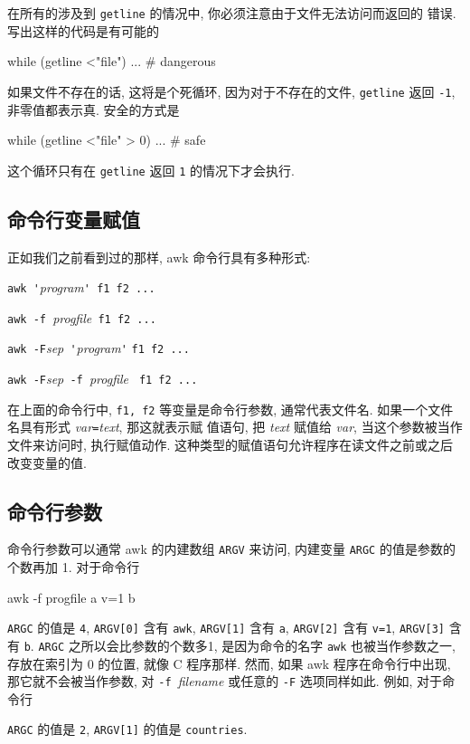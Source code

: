 在所有的涉及到 \verb'getline' 的情况中, 你必须注意由于文件无法访问而返回的
错误. 写出这样的代码是有可能的
\begin{awkcode}
    while (getline <"file") ...     # dangerous
\end{awkcode}
如果文件不存在的话, 这将是个死循环, 因为对于不存在的文件, \verb'getline'
返回 \verb'-1', 非零值都表示真. 安全的方式是
\begin{awkcode}
    while (getline <"file" > 0) ...     # safe
\end{awkcode}
这个循环只有在 \verb'getline' 返回 \texttt{1} 的情况下才会执行.

\subsection{命令行变量赋值}
\label{subsec:command_line_variable_assignments}

正如我们之前看到过的那样, awk 命令行具有多种形式:
\begin{pattern}
    \indent\verb"awk '"\textit{program}\verb"' f1 f2 ..." \par
    \indent\verb"awk -f "\textit{progfile}\verb" f1 f2 ..." \par
    \indent\verb"awk -F"\textit{sep}\verb" '"\textit{program}\verb"'"
    \verb"f1 f2 ..." \par
    \indent\verb"awk -F"\textit{sep}\verb" -f "\textit{progfile}
        \verb" f1 f2 ..." \par
\end{pattern}
在上面的命令行中, \verb'f1, f2' 等变量是命令行参数, 通常代表文件名. 
如果一个文件名具有形式 \textit{var}\verb'='\textit{text}, 那这就表示赋
值语句, 把 \textit{text} 赋值给 \textit{var}, 当这个参数被当作文件来访问时,
执行赋值动作. 这种类型的赋值语句允许程序在读文件之前或之后改变变量的值.

\subsection{命令行参数}
\label{subsec:command_line_arguments}

命令行参数可以通常 awk 的内建数组 \verb'ARGV' 来访问, 内建变量 \verb'ARGC'
的值是参数的个数再加 1. 对于命令行
\begin{awkcode}
    awk -f progfile a v=1 b
\end{awkcode}
\verb'ARGC' 的值是 \verb'4', \verb'ARGV[0]' 含有 \verb'awk', \verb'ARGV[1]'
含有 \verb'a', \verb'ARGV[2]' 含有 \verb'v=1', \verb'ARGV[3]' 含有
\verb'b'. \verb'ARGC' 之所以会比参数的个数多1, 是因为命令的名字 \verb'awk'
也被当作参数之一, 存放在索引为 0 的位置, 就像 C 程序那样. 然而, 如果 awk 
程序在命令行中出现, 那它就不会被当作参数, 对 \verb'-f '\textit{filename}
或任意的 \verb'-F' 选项同样如此. 例如, 对于命令行
\verb'ARGC' 的值是 \verb'2', \verb'ARGV[1]' 的值是 \verb'countries'.

